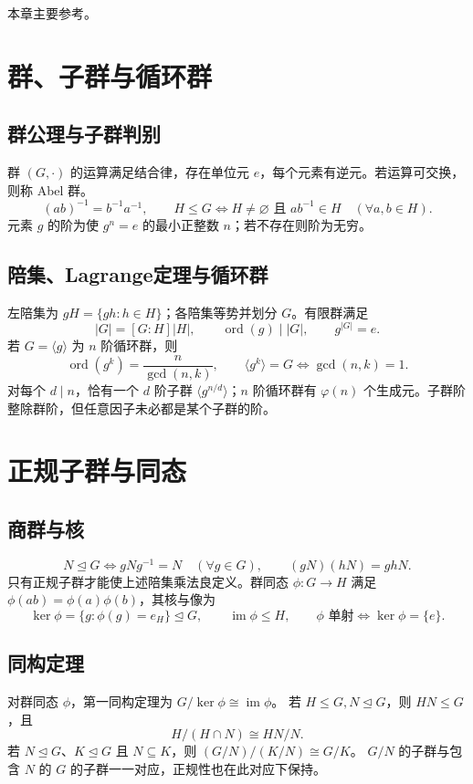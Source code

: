 \documentclass[../main.tex]{subfiles}
\begin{document}
本章主要参考\cite{milneGT}。

\section{群、子群与循环群}
\subsection{群公理与子群判别}
群 $(G,\cdot)$ 的运算满足结合律，存在单位元 $e$，每个元素有逆元。若运算可交换，则称 Abel 群。
\[
(ab)^{-1}=b^{-1}a^{-1},\qquad
H\le G\iff H\ne\varnothing\text{ 且 }ab^{-1}\in H\quad(\forall a,b\in H).
\]
元素 $g$ 的阶为使 $g^n=e$ 的最小正整数 $n$；若不存在则阶为无穷。
\subsection{陪集、Lagrange定理与循环群}
左陪集为 $gH=\{gh:h\in H\}$；各陪集等势并划分 $G$。有限群满足
\[
|G|=[G:H]|H|,\qquad \operatorname{ord}(g)\mid |G|,\qquad g^{|G|}=e.
\]
若 $G=\langle g\rangle$ 为 $n$ 阶循环群，则
\[
\operatorname{ord}(g^k)=\frac n{\gcd(n,k)},\qquad
\langle g^k\rangle=G\iff\gcd(n,k)=1.
\]
对每个 $d\mid n$，恰有一个 $d$ 阶子群 $\langle g^{n/d}\rangle$；$n$ 阶循环群有 $\varphi(n)$ 个生成元。子群阶整除群阶，但任意因子未必都是某个子群的阶。
\section{正规子群与同态}
\subsection{商群与核}
\[
N\trianglelefteq G\iff gNg^{-1}=N\quad(\forall g\in G),\qquad
(gN)(hN)=ghN.
\]
只有正规子群才能使上述陪集乘法良定义。群同态 $\phi:G\to H$ 满足 $\phi(ab)=\phi(a)\phi(b)$，其核与像为
\[
\ker\phi=\{g:\phi(g)=e_H\}\trianglelefteq G,\qquad
\operatorname{im}\phi\le H,\qquad \phi\text{ 单射}\iff\ker\phi=\{e\}.
\]
\subsection{同构定理}
对群同态 $\phi$，第一同构定理为 $G/\ker\phi\cong\operatorname{im}\phi$。
若 $H\le G,N\trianglelefteq G$，则 $HN\le G$，且
\[
H/(H\cap N)\cong HN/N.
\]
若 $N\trianglelefteq G$、$K\trianglelefteq G$ 且 $N\subseteq K$，则 $(G/N)/(K/N)\cong G/K$。
$G/N$ 的子群与包含 $N$ 的 $G$ 的子群一一对应，正规性也在此对应下保持。
\end{document}
